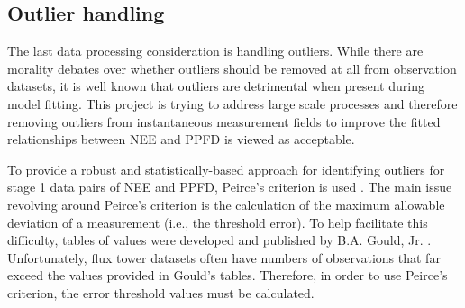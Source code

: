 \subsection{Outlier handling}
\label{sec:mst1out}
The last data processing consideration is handling outliers.  
While there are morality debates over whether outliers should be removed at all from observation datasets, it is well known that outliers are detrimental when present during model fitting.  
This project is trying to address large scale processes and therefore removing outliers from instantaneous measurement fields to improve the fitted relationships between NEE and PPFD is viewed as acceptable.

To provide a robust and statistically-based approach for identifying outliers for stage 1 data pairs of NEE and PPFD, Peirce's criterion is used \parencite{peirce52}.  
The main issue revolving around Peirce's criterion is the calculation of the maximum allowable deviation of a measurement (i.e., the threshold error).  
To help facilitate this difficulty, tables of values were developed and published by B.A. Gould, Jr. \parencite{gould55}.  
Unfortunately, flux tower datasets often have numbers of observations that far exceed the values provided in Gould's tables. 
Therefore, in order to use Peirce's criterion, the error threshold values must be calculated.

